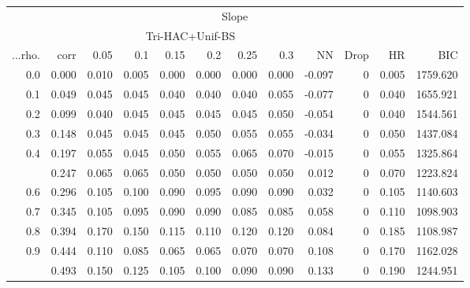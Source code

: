 \documentclass[
]{article}
\begin{document}
\begin{table}
{\begin{tabular}[t]{rrrrrrrrrrrr}
\toprule
\multicolumn{12}{c}{Slope} \\
\cmidrule(l{3pt}r{3pt}){1-12}
\multicolumn{2}{c}{ } & \multicolumn{6}{c}{Tri-HAC+Unif-BS} \\
\cmidrule(l{3pt}r{3pt}){3-8}
...rho. & corr & 0.05 & 0.1 & 0.15 & 0.2 & 0.25 & 0.3 & NN & Drop & HR & BIC\\
\midrule
0.0 & 0.000 & 0.010 & 0.005 & 0.000 & 0.000 & 0.000 & 0.000 & -0.097 & 0 & 0.005 & 1759.620\\
0.1 & 0.049 & 0.045 & 0.045 & 0.040 & 0.040 & 0.040 & 0.055 & -0.077 & 0 & 0.040 & 1655.921\\
0.2 & 0.099 & 0.040 & 0.045 & 0.045 & 0.045 & 0.045 & 0.050 & -0.054 & 0 & 0.040 & 1544.561\\
0.3 & 0.148 & 0.045 & 0.045 & 0.045 & 0.050 & 0.055 & 0.055 & -0.034 & 0 & 0.050 & 1437.084\\
0.4 & 0.197 & 0.055 & 0.045 & 0.050 & 0.055 & 0.065 & 0.070 & -0.015 & 0 & 0.055 & 1325.864\\
\addlinespace
0.5 & 0.247 & 0.065 & 0.065 & 0.050 & 0.050 & 0.050 & 0.050 & 0.012 & 0 & 0.070 & 1223.824\\
0.6 & 0.296 & 0.105 & 0.100 & 0.090 & 0.095 & 0.090 & 0.090 & 0.032 & 0 & 0.105 & 1140.603\\
0.7 & 0.345 & 0.105 & 0.095 & 0.090 & 0.090 & 0.085 & 0.085 & 0.058 & 0 & 0.110 & 1098.903\\
0.8 & 0.394 & 0.170 & 0.150 & 0.115 & 0.110 & 0.120 & 0.120 & 0.084 & 0 & 0.185 & 1108.987\\
0.9 & 0.444 & 0.110 & 0.085 & 0.065 & 0.065 & 0.070 & 0.070 & 0.108 & 0 & 0.170 & 1162.028\\
\addlinespace
1.0 & 0.493 & 0.150 & 0.125 & 0.105 & 0.100 & 0.090 & 0.090 & 0.133 & 0 & 0.190 & 1244.951\\
\bottomrule
\end{tabular}

}

\end{table}%
\end{document}
